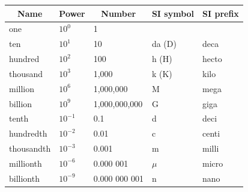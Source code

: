\documentclass{article}
\begin{document}
\begin{table}[ht]
\begin{tabular}{|l|l|l|l|l|}
\hline
\multicolumn{1}{|c|}{\textbf{Name}} & \multicolumn{1}{c|}{\textbf{Power}} & \multicolumn{1}{c|}{\textbf{Number}} & \multicolumn{1}{c|}{\textbf{SI symbol}} & \multicolumn{1}{c|}{\textbf{SI prefix}} \\ \hline
one                                 & $10^0$& 1                                    &                                         &                                         \\ \hline
ten                                 & $10^1$                                   & 10                                   & da (D)                                  & deca                                    \\ \hline
hundred                             & $10^2$                                   & 100                                  & h (H)                                   & hecto                                   \\ \hline
thousand                            & $10^3$                                  & 1,000                                & k (K)                                   & kilo                                    \\ \hline
million                             & $10^6$                                   & 1,000,000                            & M                                       & mega                                    \\ \hline
billion                             & $10^9$                                  & 1,000,000,000                        & G                                       & giga                                    \\ \hline
tenth                               & $10^{-1}$                                 & 0.1                                  & d                                       & deci                                    \\ \hline
hundredth                           & $10^{-2}$                                  & 0.01                                 & c                                       & centi                                   \\ \hline
thousandth                          & $10^{-3} $                                 & 0.001                                & m                                       & milli                                   \\ \hline
millionth                           &$10^{-6} $                               & 0.000 001                            & $\mu$                                      & micro                                   \\ \hline
billionth                           & $10^{-9} $                               & 0.000 000 001                        & n                                       & nano                                    \\ \hline
\end{tabular}
\end{table}
\end{document}
